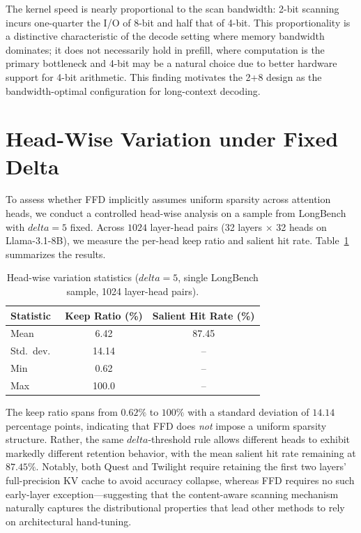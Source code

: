 \documentclass[]{mosi}
\def\delta{delta}%
\theoremstyle{plain}
\theoremstyle{definition}
\theoremstyle{remark}
\begin{document}
The kernel speed is nearly proportional to the scan bandwidth: 2-bit scanning incurs one-quarter the I/O of 8-bit and half that of 4-bit. This proportionality is a distinctive characteristic of the decode setting where memory bandwidth dominates; it does not necessarily hold in prefill, where computation is the primary bottleneck and 4-bit may be a natural choice due to better hardware support for 4-bit arithmetic. This finding motivates the 2+8 design as the bandwidth-optimal configuration for long-context decoding.


\section{Head-Wise Variation under Fixed Delta}
\label{app:headwise}

To assess whether FFD implicitly assumes uniform sparsity across attention heads, we conduct a controlled head-wise analysis on a sample from LongBench with $\delta=5$ fixed. Across $1024$ layer-head pairs (32 layers $\times$ 32 heads on Llama-3.1-8B), we measure the per-head keep ratio and salient hit rate. Table~\ref{tab:headwise} summarizes the results.

\begin{table}[h]
\caption{Head-wise variation statistics ($\delta=5$, single LongBench sample, 1024 layer-head pairs).}
\label{tab:headwise}
\begin{center}
\begin{tabular}{lcc}
\toprule
Statistic & Keep Ratio (\%) & Salient Hit Rate (\%) \\
\midrule
Mean      & 6.42  & 87.45 \\
Std.\ dev.\ & 14.14 & -- \\
Min       & 0.62  & -- \\
Max       & 100.0 & -- \\
\bottomrule
\end{tabular}
\end{center}
\end{table}

The keep ratio spans from $0.62\%$ to $100\%$ with a standard deviation of $14.14$ percentage points, indicating that FFD does \emph{not} impose a uniform sparsity structure. Rather, the same $\delta$-threshold rule allows different heads to exhibit markedly different retention behavior, with the mean salient hit rate remaining at $87.45\%$. Notably, both Quest and Twilight require retaining the first two layers' full-precision KV cache to avoid accuracy collapse, whereas FFD requires no such early-layer exception---suggesting that the content-aware scanning mechanism naturally captures the distributional properties that lead other methods to rely on architectural hand-tuning.
\end{document}
